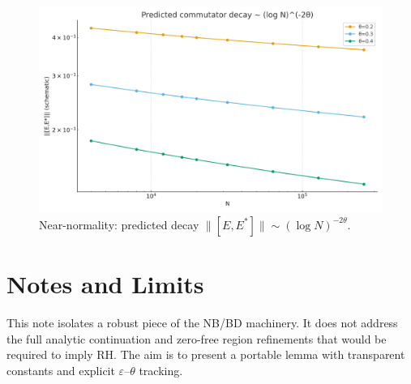 \documentclass[11pt]{article}
\theoremstyle{remark}
\begin{document}
\begin{figure}[h]
\centering
\includegraphics[width=0.75\linewidth]{figures/commutator_decay_multi.png}
\caption{Near-normality: predicted decay $\|[E,E^\ast]\|\sim (\log N)^{-2\theta}$.}
\end{figure}

\section*{Notes and Limits}
This note isolates a robust piece of the NB/BD machinery.
It does not address the full analytic continuation and zero-free region refinements
that would be required to imply RH. The aim is to present a portable lemma with
transparent constants and explicit $\varepsilon$--$\theta$ tracking.
\end{document}
